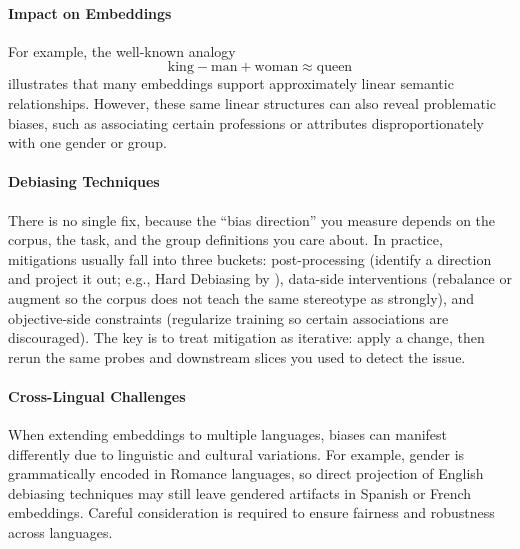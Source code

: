 \paragraph{Impact on Embeddings}

For example, the well-known analogy
\[
\text{king} - \text{man} + \text{woman} \approx \text{queen}
\]
illustrates that many embeddings support approximately linear semantic relationships. However, these same linear structures can also reveal problematic biases, such as associating certain professions or attributes disproportionately with one gender or group.

\paragraph{Debiasing Techniques}

There is no single fix, because the ``bias direction'' you measure depends on the corpus, the task, and the group definitions you care about. In practice, mitigations usually fall into three buckets: post-processing (identify a direction and project it out; e.g., Hard Debiasing by \citet{Bolukbasi2016}), data-side interventions (rebalance or augment so the corpus does not teach the same stereotype as strongly), and objective-side constraints (regularize training so certain associations are discouraged). The key is to treat mitigation as iterative: apply a change, then rerun the same probes and downstream slices you used to detect the issue.

\paragraph{Cross-Lingual Challenges}

When extending embeddings to multiple languages, biases can manifest differently due to linguistic and cultural variations. For example, gender is grammatically encoded in Romance languages, so direct projection of English debiasing techniques may still leave gendered artifacts in Spanish or French embeddings. Careful consideration is required to ensure fairness and robustness across languages.

